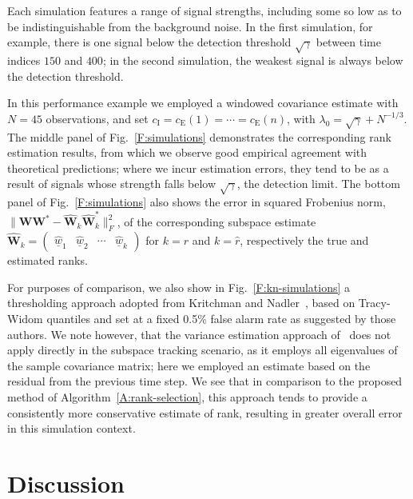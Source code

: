 \documentclass[final]{IEEEtran} %
\newcommand{\vectorsymbol}{\underline}
\newcommand{\matrixsymbol}{\boldsymbol}
\newcommand{\mW}{\matrixsymbol{W}}
\newcommand{\mhW}{\widehat{\matrixsymbol{W}}}
\newcommand{\vhw}{\hat{\vectorsymbol{w}}}
\newcommand{\ce}{c_\text{E}}
\newcommand{\ci}{c_\text{I}}
\begin{document}
Each simulation features a range of signal strengths, including some so low as to be indistinguishable from the background noise.  In the first simulation, for example, there is one signal below the detection threshold $\sqrt{\gamma}$ between time indices $150$ and $400$; in the second simulation, the weakest signal is always below the detection threshold.

In this performance example we employed a windowed covariance estimate with $N = 45$ observations, and set $\ci = \ce(1) = \cdots = \ce(n)$, with $\lambda_0 = \sqrt{\gamma} + N^{-1/3}$.  The middle panel of Fig.~\ref{F:simulations} demonstrates the corresponding rank estimation results, from which we observe good empirical agreement with theoretical predictions; where we incur estimation errors, they tend to be as a result of signals whose strength falls below $\sqrt{\gamma}$, the detection limit.  The bottom panel of Fig.~\ref{F:simulations} also shows the error in squared Frobenius norm, $\| \mW \mW^\ast - \mhW_k \mhW^\ast_k \|_F^2$, of the corresponding subspace estimate
\(
    \mhW_k
    =
    \begin{pmatrix}
        \vhw_1 & \vhw_2 & \cdots & \vhw_k
    \end{pmatrix}
\)
for $k = r$ and $k = \hat r$, respectively the true and estimated ranks.

For purposes of comparison, we also show in Fig.~\ref{F:kn-simulations} a thresholding approach adopted from Kritchman and Nadler~\cite{kritchman2008dnc}, based on Tracy-Widom quantiles and set at a fixed 0.5\% false alarm rate as suggested by those authors.  We note however, that the variance estimation approach of~\cite{kritchman2008dnc} does not apply directly in the subspace tracking scenario, as it employs all eigenvalues of the sample covariance matrix; here we employed an estimate based on the residual from the previous time step.  We see that in comparison to the proposed method of Algorithm~\ref{A:rank-selection}, this approach tends to provide a consistently more conservative estimate of rank, resulting in greater overall error in this simulation context.

\section{Discussion}
\label{s:summ}
\end{document}
